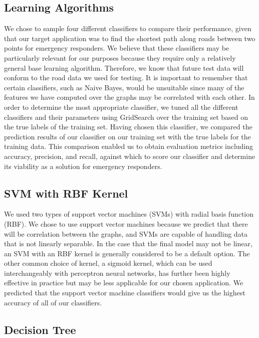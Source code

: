 \documentclass{article}
\begin{document}
\subsection{Learning Algorithms}

We  chose to sample four different classifiers to compare their performance, given that our target application was to find the shortest path along roads between two points for emergency responders. We believe that these classifiers may be particularly relevant for our purposes because they require only a relatively general base learning algorithm. Therefore, we know that future test data will conform to the road data we used for testing. It is important to remember that certain classifiers, such as Naive Bayes, would be unsuitable since many of the features we have computed over the graphs may be correlated with each other. In order to determine the most appropriate classifier, we tuned all the different classifiers and their parameters using GridSearch over the training set based on the true labels of the training set. Having chosen this classifier, we compared the prediction results of our classifier on our training set with the true labels for the training data. This comparison enabled us to obtain evaluation metrics including accuracy, precision, and recall, against which to score our classifier and determine its viability as a solution for emergency responders.

\subsection{SVM with RBF Kernel}

We used two types of support vector machines (SVMs) with radial basis function (RBF). We chose to use support vector machines because we predict that there will be correlation between the graphs, and SVMs are capable of handling data that is not linearly separable. In the case that the final model may not be linear, an SVM with an RBF kernel is generally considered to be a default option. The other common choice of kernel, a sigmoid kernel, which can be used interchangeably with perceptron neural networks, has further been highly effective in practice but may be less applicable for our chosen application. We predicted that the support vector machine classifiers would give us the highest accuracy of all of our classifiers.

\subsection{Decision Tree}
\end{document}
